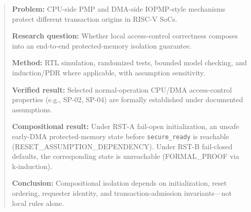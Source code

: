 
\begin{abstract}
\textbf{Problem:} CPU-side PMP and DMA-side IOPMP-style mechanisms protect different transaction origins in RISC-V SoCs.

\textbf{Research question:} Whether local access-control correctness composes into an end-to-end protected-memory isolation guarantee.

\textbf{Method:} RTL simulation, randomized tests, bounded model checking, and induction/PDR where applicable, with assumption sensitivity.

\textbf{Verified result:} Selected normal-operation CPU/DMA access-control properties (e.g., SP-02, SP-04) are formally established under documented assumptions.

\textbf{Compositional result:} Under RST-A fail-open initialization, an unsafe early-DMA protected-memory state before \texttt{secure\_ready} is reachable (RESET\_ASSUMPTION\_DEPENDENCY). Under RST-B fail-closed defaults, the corresponding state is unreachable (FORMAL\_PROOF via k-induction).

\textbf{Conclusion:} Compositional isolation depends on initialization, reset ordering, requester identity, and transaction-admission invariants---not local rules alone.

\end{abstract}
